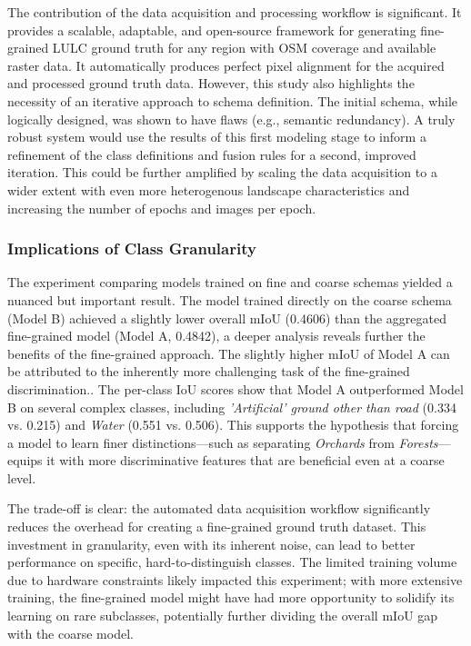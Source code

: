 \documentclass{report}
\begin{document}
The contribution of the data acquisition and processing workflow is significant. It provides a scalable, adaptable, and open-source framework for generating fine-grained LULC ground truth for any region with OSM coverage and available raster data. It automatically produces perfect pixel alignment for the acquired and processed ground truth data. However, this study also highlights the necessity of an iterative approach to schema definition. The initial schema, while logically designed, was shown to have flaws (e.g., semantic redundancy). A truly robust system would use the results of this first modeling stage to inform a refinement of the class definitions and fusion rules for a second, improved iteration. This could be further amplified by scaling the data acquisition to a wider extent with even more heterogenous landscape characteristics and increasing the number of epochs and images per epoch.

\subsubsection{Implications of Class Granularity}
The experiment comparing models trained on fine and coarse schemas yielded a nuanced but important result. The model trained directly on the coarse schema (Model B) achieved a slightly lower overall mIoU (0.4606) than the aggregated fine-grained model (Model A, 0.4842), a deeper analysis reveals further the benefits of the fine-grained approach. The slightly higher mIoU of Model A can be attributed to the inherently more challenging task of the fine-grained discrimination..
The per-class IoU scores show that Model A outperformed Model B on several complex classes, including \textit{'Artificial' ground other than road} (0.334 vs. 0.215) and \textit{Water} (0.551 vs. 0.506). This supports the hypothesis that forcing a model to learn finer distinctions—such as separating \textit{Orchards} from \textit{Forests}—equips it with more discriminative features that are beneficial even at a coarse level. \par
The trade-off is clear: the automated data acquisition workflow significantly reduces the overhead for creating a fine-grained ground truth dataset. This investment in granularity, even with its inherent noise, can lead to better performance on specific, hard-to-distinguish classes. The limited training volume due to hardware constraints likely impacted this experiment; with more extensive training, the fine-grained model might have had more opportunity to solidify its learning on rare subclasses, potentially further dividing the overall mIoU gap with the coarse model.
\end{document}
